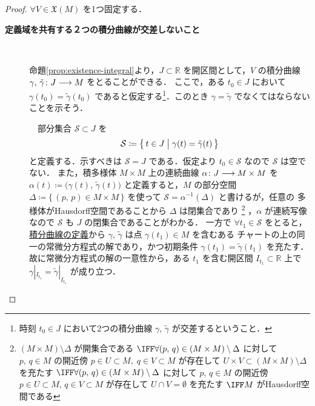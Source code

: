 \documentclass[TQFT_main]{subfiles}
\begin{document}
\begin{proof}
    $\forall V \in \mathfrak{X}(M)$ を1つ固定する．
    \begin{description}
        \item[\textbf{定義域を共有する２つの積分曲線が交差しないこと}]　
        
        命題\ref{prop:existence-integral}より，$J \subset \mathbb{R}$ を開区間として，$V$ の積分曲線 $\gamma,\, \tilde{\gamma} \colon J \longrightarrow M$ をとることができる．
        ここで，ある $t_0 \in J$ において $\gamma(t_0) = \tilde{\gamma} (t_0)$ であると仮定する\footnote{時刻 $t_0 \in J$ において2つの積分曲線 $\gamma,\, \tilde{\gamma}$ が交差するということ．}．このとき $\gamma = \tilde{\gamma}$ でなくてはならないことを示そう．

        　部分集合 $\mathcal{S} \subset J$ を
        \begin{align}
            \mathcal{S} \coloneqq \bigl\{\, t \in J \bigm| \gamma(t) = \tilde{\gamma}(t) \,\bigr\} 
        \end{align}
        と定義する．示すべきは $\mathcal{S} = J$ である．仮定より $t_0 \in \mathcal{S}$ なので $\mathcal{S}$ は空でない．
        また，積多様体 $M \times M$ 上の連続曲線 $\alpha \colon J \longrightarrow M \times M$ を $\alpha(t) \coloneqq \bigl( \gamma(t),\, \tilde{\gamma}(t) \bigr)$ と定義すると，$M$ の部分空間 $\Delta \coloneqq \bigl\{\, (p,\, p) \in M \times M \,\bigr\}$ を使って $\mathcal{S} = \alpha^{-1}(\Delta)$ と書けるが，任意の \cinfty 多様体がHausdorff空間であることから $\Delta$ は閉集合であり
        \footnote{$(M \times M) \setminus \Delta$ が開集合である $\IFF \forall (p,\, q) \in (M \times M) \setminus \Delta$ に対して $p,\, q \in M$ の開近傍 $p \in U \subset M,\; q \in V \subset M$ が存在して $U \times V \subset (M \times M) \setminus \Delta$ を充たす $\IFF \forall (p,\, q) \in (M \times M) \setminus \Delta$ に対して $p,\, q \in M$ の開近傍 $p \in U \subset M,\, q \in V \subset M$ が存在して $U \cap V = \emptyset$ を充たす $\IFF M$ がHausdorff空間である}
        ，$\alpha$ が連続写像なので $\mathcal{S}$ も $J$ の閉集合であることがわかる．
        一方で $\forall t_1 \in \mathcal{S}$ をとると，\hyperref[def:integral-curve]{積分曲線の定義}から $\gamma,\, \tilde{\gamma}$ は点 $\gamma(t_1) \in M$ を含むある \cinfty チャートの上の同一の常微分方程式の解であり，かつ初期条件 $\gamma(t_1) = \tilde{\gamma}(t_1)$ を充たす．故に常微分方程式の解の一意性から，ある $t_1$ を含む開区間 $I_{t_1} \subset \mathbb{R}$ 上で $\gamma|_{I_{t_1}} = \tilde{\gamma}|_{I_{t_1}}$ が成り立つ．

\end{description}
\end{proof}
\end{document}
